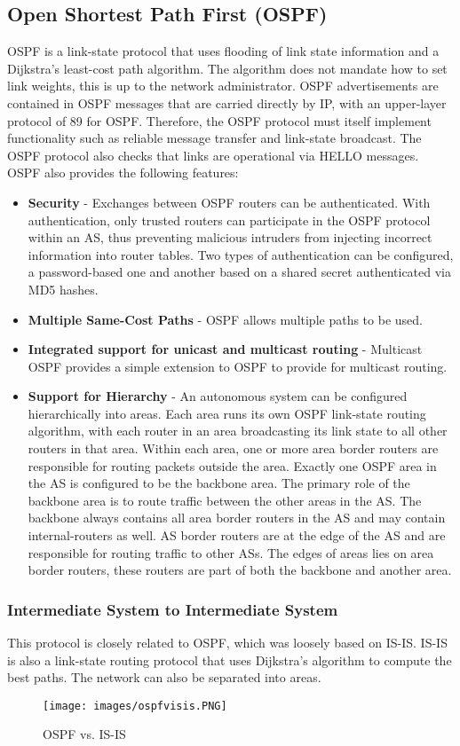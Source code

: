 \subsection{Open Shortest Path First (OSPF)}
OSPF is a link-state protocol that uses flooding of link state information and a Dijkstra's least-cost path algorithm. The algorithm does not mandate how to set link weights, this is up to the network administrator. OSPF advertisements are contained in OSPF messages that are carried directly by IP, with an upper-layer protocol of 89 for OSPF. Therefore, the OSPF protocol must itself implement functionality such as reliable message transfer and link-state broadcast. The OSPF protocol also checks that links are operational via HELLO messages. OSPF also provides the following features:
\begin{itemize}
\item \textbf{Security} - Exchanges between OSPF routers can be authenticated. With authentication, only trusted routers can participate in the OSPF protocol within an AS, thus preventing malicious intruders from injecting incorrect information into router tables. Two types of authentication can be configured, a password-based one and another based on a shared secret authenticated via MD5 hashes.
\item \textbf{Multiple Same-Cost Paths} - OSPF allows multiple paths to be used.
\item \textbf{Integrated support for unicast and multicast routing} - Multicast OSPF provides a simple extension to OSPF to provide for multicast routing.
\item \textbf{Support for Hierarchy} - An autonomous system can be configured hierarchically into areas. Each area runs its own OSPF link-state routing algorithm, with each router in an area broadcasting its link state to all other routers in that area. Within each area, one or more area border routers are responsible for routing packets outside the area. Exactly one OSPF area in the AS is configured to be the backbone area. The primary role of the backbone area is to route traffic between the other areas in the AS. The backbone always contains all area border routers in the AS and may contain internal-routers as well. AS border routers are at the edge of the AS and are responsible for routing traffic to other ASs. The edges of areas lies on area border routers, these routers are part of both the backbone and another area.
\end{itemize}

\subsubsection{Intermediate System to Intermediate System}
This protocol is closely related to OSPF, which was loosely based on IS-IS. IS-IS is also a link-state routing protocol that uses Dijkstra's algorithm to compute the best paths. The network can also be separated into areas.
\begin{figure}
\centering
\texttt{[image: images/ospfvisis.PNG]}
\caption{OSPF vs. IS-IS}
\label{ospfvisis}
\end{figure}

